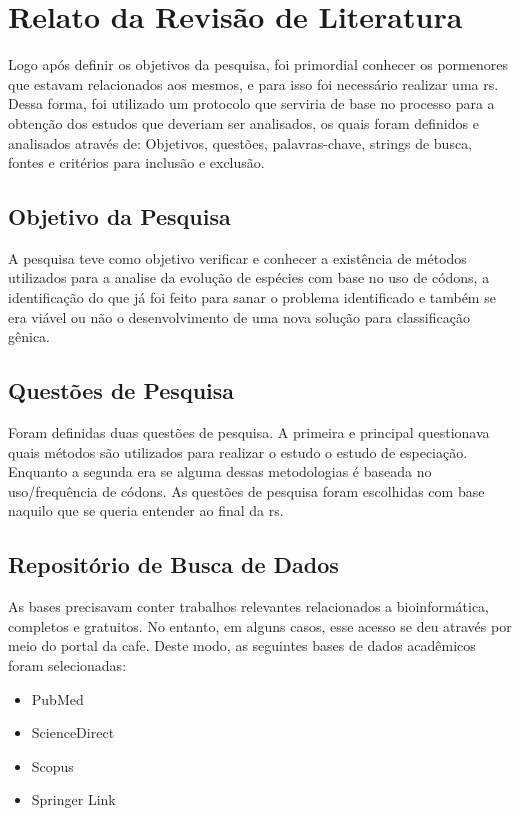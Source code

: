 \documentclass[12pt]{article}
\begin{document}
\section{Relato da Revisão de Literatura}

Logo após definir os objetivos da pesquisa, foi primordial conhecer os pormenores que estavam relacionados aos mesmos, e para isso foi necessário realizar uma \gls{rs}. Dessa forma, foi utilizado um protocolo que serviria de base no processo para a obtenção dos estudos que deveriam ser analisados, os quais foram definidos e analisados através de: Objetivos, questões, palavras-chave, strings de busca, fontes e critérios para inclusão e exclusão.

\subsection{Objetivo da Pesquisa}

A pesquisa teve como objetivo verificar e conhecer a existência de métodos utilizados para a analise da evolução de espécies com base no uso de códons, a identificação do que já foi feito para sanar o problema identificado e também se era viável ou não o desenvolvimento de uma nova solução para classificação gênica.

\subsection{Questões de Pesquisa}

Foram definidas duas questões de pesquisa. A primeira e principal questionava quais métodos são utilizados para realizar o estudo o estudo de especiação. Enquanto a segunda era se alguma dessas metodologias é baseada no uso/frequência de códons. As questões de pesquisa foram escolhidas com base naquilo que se queria entender ao final da \gls{rs}.

\subsection{Repositório de Busca de Dados}

As bases precisavam conter trabalhos relevantes relacionados a bioinformática, completos e gratuitos. No entanto, em alguns casos, esse acesso se deu através por meio do portal da \gls{cafe}. Deste modo, as seguintes bases de dados acadêmicos foram selecionadas:
\begin{itemize}
    \item{PubMed}
    \item{ScienceDirect}
    \item{Scopus}
    \item{Springer Link}
\end{itemize}
\end{document}
